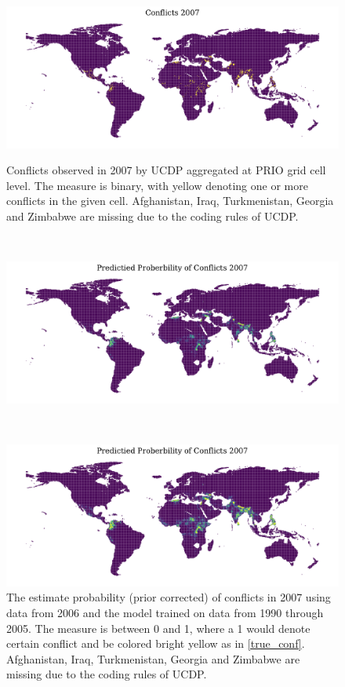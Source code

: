 \documentclass[a4paper]{article}
\begin{document}
\begin{figure}[!htb]
  \centering
  \begin{minipage}[b]{1\textwidth}
    \includegraphics[width=\textwidth]{conflicts_2007.pdf}
    \caption{\footnotesize{Conflicts observed in 2007 by UCDP aggregated at PRIO grid cell level. The measure is binary, with yellow denoting one or more conflicts in the given cell. Afghanistan, Iraq, Turkmenistan, Georgia and Zimbabwe are missing due to the coding rules of UCDP.}}\label{true_conf2}
  \end{minipage}
  \\	
  \begin{minipage}[b]{1\textwidth}
    \includegraphics[width=\textwidth]{pred_prob_conflicts_2007_bayes.pdf}
    \caption{\footnotesize{The estimate probability (prior corrected) of conflicts in 2007 using data from 2006 and the model trained on data from 1990 through 2005. The measure is between 0 and 1, where a 1 would denote certain conflict and be colored bright yellow as in \autoref{true_conf}. Afghanistan, Iraq, Turkmenistan, Georgia and Zimbabwe are missing due to the coding rules of UCDP.}}\label{pred_conf_b2}
  \end{minipage}
  \\
  \begin{minipage}[b]{1\textwidth}
    \includegraphics[width=\textwidth]{pred_prob_conflicts_2007.pdf}

\end{minipage}
\end{figure}
\end{document}
